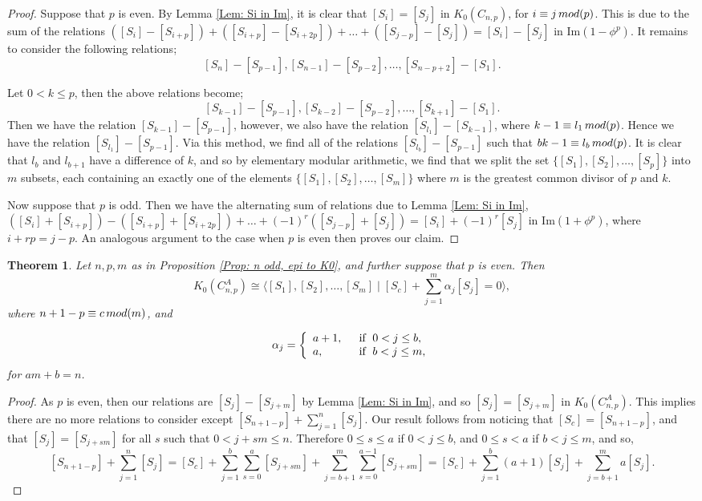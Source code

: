 \documentclass[a4paper,reqno,11pt]{amsart}
\newtheorem{theorem}{Theorem}[section]
\theoremstyle{definition}
\def \text{\mbox}
\renewcommand{\mod}{\mathop{\rm mod}\nolimits}%
\begin{document}
\begin{proof}
	Suppose that $p$ is even.
	By Lemma \ref{Lem: Si in Im}, it is clear that $[S_i] = [S_j]$ in $K_0(C_{n,p})$, for $i \equiv j \mod (p)$.
	This is due to the sum of the relations $([S_i] - [S_{i+p}]) + ([S_{i+p}] - [S_{i+2p}]) + \ldots + ([S_{j-p}] - [S_j]) = [S_i] - [S_j]$ in $\mathrm{Im}(1 - \phi^p)$.
	It remains to consider the following relations;
	\[
	[S_n] - [S_{p-1}], [S_{n-1}] - [S_{p-2}], \ldots, [S_{n-p+2}] - [S_1].
	\]
	
	Let $ 0 < k \leq p$, then the above relations become;
	\[
	[S_{k-1}] - [S_{p-1}], [S_{k-2}] - [S_{p-2}], \ldots, [S_{k+1}] - [S_1].
	\]
	Then we have the relation $[S_{k-1}] - [S_{p-1}]$, however, we also have the relation $[S_{l_1}] - [S_{k-1}]$, where $k-1 \equiv l_1 \mod(p)$.
	Hence we have the relation $[S_{l_1}] - [S_{p-1}]$.
	Via this method, we find all of the relations $[S_{l_b}] - [S_{p-1}]$ such that $bk -1 \equiv l_b \mod(p)$.
	It is clear that $l_b$ and $l_{b+1}$ have a difference of $k$, and so by elementary modular arithmetic, we find that we split the set $\{[S_1], [S_2], \ldots, [S_p]\}$ into $m$ subsets, each containing an exactly one of the elements $\{[S_1], [S_2], \ldots, [S_m]\}$ where $m$ is the greatest common divisor of $p$ and $k$.
	
	Now suppose that $p$ is odd.
	Then we have the alternating sum of relations due to Lemma \ref{Lem: Si in Im}, $([S_i] + [S_{i+p}]) - ([S_{i+p}] + [S_{i+2p}]) + \ldots + (-1)^r ([S_{j-p}] + [S_j]) = [S_i] + (-1)^r [S_j]$ in $\mathrm{Im}(1 + \phi^p)$, where $i + rp = j-p$.
	An analogous argument to the case when $p$ is even then proves our claim.
\end{proof}

\begin{theorem}\label{Thm: n odd, p even}
	Let $n,p,m$ as in Proposition \ref{Prop: n odd, epi to K0}, and further suppose that $p$ is even.
	Then
	\[
	K_0(C_{n,p}^A) \cong \langle [S_1], [S_2], \ldots, [S_m] \mid [S_c] + \sum_{j=1}^{m} \alpha_j [S_j] = 0 \rangle,
	\]
	where $n+1-p \equiv c \mod(m)$, and

\[ \alpha_j =\left\{
\begin{array}{ll}
a+1, & \text{\; if \;} 0<j \leq b,\\
		a, & \text{\; if \;} b < j \leq m,
\end{array}
\right.
\]	
for $am+b=n$.
\end{theorem}

\begin{proof}
	As $p$ is even, then our relations are $[S_j] - [S_{j+m}]$ by Lemma \ref{Lem: Si in Im}, and so $[S_j] = [S_{j+m}]$ in $K_0(C_{n,p}^A)$.
	This implies there are no more relations to consider except $[S_{n+1-p}] + \sum_{j=1}^{n} [S_j]$.
	Our result follows from noticing that $[S_c] = [S_{n+1-p}]$, and that $[S_j] = [S_{j+sm}]$ for all $s$ such that $0 < j+sm \leq n$.
	Therefore $0 \leq s \leq a$ if $0 < j \leq b$, and $0 \leq s < a$ if $b < j \leq m$, and so,
	\[
	[S_{n+1-p}] + \sum_{j=1}^{n} [S_j] = [S_c] + \sum_{j=1}^b \sum_{s=0}^a [S_{j+sm}] + \sum_{j=b+1}^m \sum_{s=0}^{a-1} [S_{j+sm}] = [S_c] + \sum_{j=1}^b (a+1) [S_j] + \sum_{j=b+1}^m a [S_j].
	\]
\end{proof}
\end{document}
